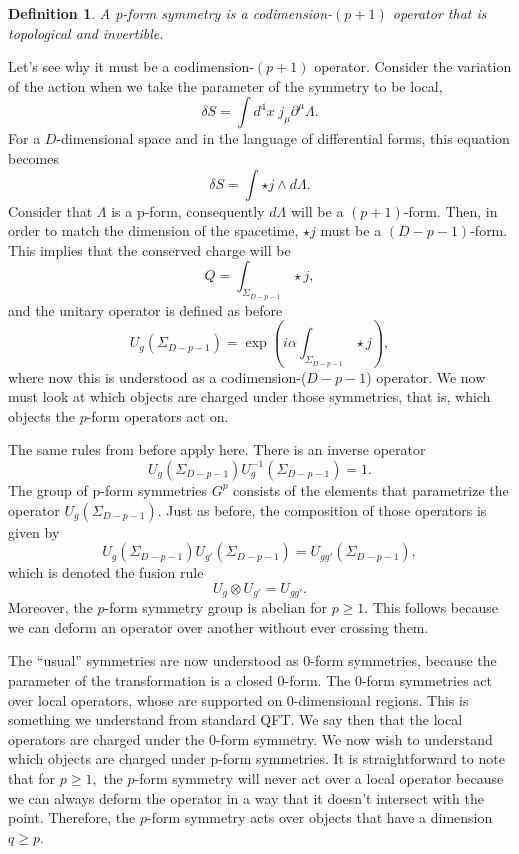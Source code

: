 \documentclass{article}
\newtheorem{definition}{Definition}
\begin{document}
\begin{definition}
	A p-form symmetry is a codimension-$(p+1)$ operator that is topological and invertible. 
\end{definition}
Let’s see why it must be a codimension-$(p+1)$ operator. Consider the variation of the action when we take the parameter of the symmetry to be local,
\begin{equation}
	\delta S=\int d^4x\;j_\mu\partial^\mu\Lambda.
\end{equation}
For a $D$-dimensional space and in the language of differential forms, this equation becomes 
\begin{equation}
	\delta S=\int\star j\wedge d\Lambda.
\end{equation}
Consider that $\Lambda$  is a p-form, consequently $d\Lambda$ will be a $(p+1)$-form. Then, in order to match the dimension of the spacetime, $\star j$ must be a $(D-p-1)$-form. This implies that the conserved charge will be 
\begin{equation}
	Q=\int_{\Sigma_{D-p-1}} \star j,
\end{equation}
and the unitary operator is defined as before
\begin{equation}
	U_g(\Sigma_{D-p-1})=\exp\left(i\alpha\int_{\Sigma_{D-p-1}}\star j\right),
\end{equation}
where now this is understood as a codimension-($D-p-1$) operator.
We now must look at which objects are charged under those symmetries, that is, which objects the $p$-form operators act on.

The same rules from before apply here. There is an inverse operator
\begin{equation}
	U_g(\Sigma_{D-p-1})U_g^{-1}(\Sigma_{D-p-1})=1.
\end{equation}
The group of p-form symmetries $G^{p}$  consists of the elements that parametrize the operator $U_g(\Sigma_{D-p-1}).$ Just as before, the composition of those operators is given by  
\begin{equation}
	U_g(\Sigma_{D-p-1})U_{g'}(\Sigma_{D-p-1})=U_{gg'}(\Sigma_{D-p-1}),
\end{equation}
which is denoted the fusion rule 
\begin{equation}
	U_g\otimes U_{g'}=U_{gg'}.
\end{equation}
Moreover, the $p$-form symmetry group is abelian for $p\ge 1.$ This follows because we can deform an operator over another without ever crossing them. 

The “usual” symmetries are now understood as 0-form symmetries, because the parameter of the transformation is a closed 0-form. The 0-form symmetries act over local operators, whose are supported on 0-dimensional regions. This is something we understand from standard QFT. We say then that the local operators are charged under the 0-form symmetry. We now wish to understand which objects are charged under p-form symmetries. It is straightforward to note that for $p\geq1,$ the $p$-form symmetry will never act over a local operator because we can always deform the operator in a way that it doesn’t intersect with the point. Therefore, the $p$-form symmetry acts over objects that have a dimension $q\geq p$.
\end{document}
